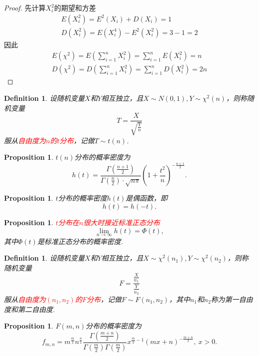 \documentclass{article}
\newtheorem{proposition}[theorem]{Proposition}
\newtheorem{definition}[theorem]{Definition}
\newcommand{\redt}[1]{\textcolor{red}{#1}}
\begin{document}
\begin{proof}
先计算$X_i^2$的期望和方差
$$
\begin{array}{ll}
E(X_i^2) = E^2(X_i) + D(X_i) = 1 \\
D(X_i^2) = E(X_i^4) - E^2(X_i^2) = 3-1 = 2
\end{array}
$$
因此
$$
\begin{array}{ll}
E(\chi^2) = E(\sum\limits_{i=1}^n X_i^2) =\sum\limits_{i=1}^n E(X_i^2) = n \\
D(\chi^2) = D(\sum\limits_{i=1}^n X_i^2) =\sum\limits_{i=1}^n D(X_i^2) = 2n 
\end{array}
$$
\end{proof}


\begin{definition}
\rm 设随机变量$X$和$Y$相互独立，且$X \sim N(0,1), Y \sim \chi^2(n)$，则称随机变量
$$
T = \frac{X}{\sqrt{\frac{Y}{n}}}
$$
服从\redt{自由度为$n$的$t$分布}，记做$T\sim t(n)$.
\end{definition}

\begin{proposition}
\rm $t(n)$分布的概率密度为
$$
h(t) =\frac{\Gamma(\frac{n+1}{2})}{\Gamma(\frac{n}{2})\cdot \sqrt{n\pi}}\left(1+\frac{t^2}{n}\right)^{-\frac{n+1}{2}}.
$$
\end{proposition}

\begin{proposition}
\rm $t$分布的概率密度$h(t)$是偶函数，即
$$
h(t)=h(-t).
$$
\end{proposition}

\begin{proposition}
\rm \redt{$t$分布在$n$很大时接近标准正态分布}
$$
\lim\limits_{n \to \infty} h(t) = \Phi(t),
$$
其中$\Phi(t)$是标准正态分布的概率密度. 
\end{proposition}

\begin{definition}
\rm 设随机变量$X$和$Y$相互独立，且$X \sim \chi^2(n_1), Y \sim \chi^2(n_2)$，则称随机变量
$$
F = \frac{\frac{X}{n_1}}{\frac{Y}{n_2}}
$$
服从\redt{自由度为$(n_1,n_2)$的$F$分布}，记做$F \sim F(n_1,n_2)$，其中$n_1$和$n_2$称为第一自由度和第二自由度. 
\end{definition}

\begin{proposition}
\rm $F(m,n)$分布的概率密度为
$$
f_{m,n} = m^{\frac{m}{2}} n^{\frac{n}{2}} \frac{\Gamma(\frac{m+n}{2})}{\Gamma(\frac{m}{2})\Gamma(\frac{m}{2})}x^{\frac{m}{2}-1}(mx+n)^{-\frac{m+n}{2}}, ~ x> 0.
$$
\end{proposition}
\end{document}
